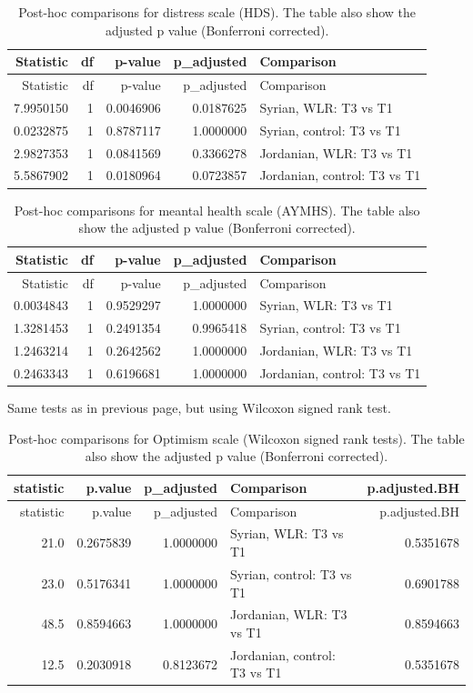 \documentclass[]{article}
\begin{document}
\begin{longtable}[]{@{}rrrrl@{}}
\caption{Post-hoc comparisons for distress scale (HDS). The table also
show the adjusted p value (Bonferroni corrected).}\tabularnewline
\toprule
Statistic & df & p-value & p\_adjusted & Comparison\tabularnewline
\midrule
\endfirsthead
\toprule
Statistic & df & p-value & p\_adjusted & Comparison\tabularnewline
\midrule
\endhead
7.9950150 & 1 & 0.0046906 & 0.0187625 & Syrian, WLR: T3 vs
T1\tabularnewline
0.0232875 & 1 & 0.8787117 & 1.0000000 & Syrian, control: T3 vs
T1\tabularnewline
2.9827353 & 1 & 0.0841569 & 0.3366278 & Jordanian, WLR: T3 vs
T1\tabularnewline
5.5867902 & 1 & 0.0180964 & 0.0723857 & Jordanian, control: T3 vs
T1\tabularnewline
\bottomrule
\end{longtable}

\begin{longtable}[]{@{}rrrrl@{}}
\caption{Post-hoc comparisons for meantal health scale (AYMHS). The
table also show the adjusted p value (Bonferroni
corrected).}\tabularnewline
\toprule
Statistic & df & p-value & p\_adjusted & Comparison\tabularnewline
\midrule
\endfirsthead
\toprule
Statistic & df & p-value & p\_adjusted & Comparison\tabularnewline
\midrule
\endhead
0.0034843 & 1 & 0.9529297 & 1.0000000 & Syrian, WLR: T3 vs
T1\tabularnewline
1.3281453 & 1 & 0.2491354 & 0.9965418 & Syrian, control: T3 vs
T1\tabularnewline
1.2463214 & 1 & 0.2642562 & 1.0000000 & Jordanian, WLR: T3 vs
T1\tabularnewline
0.2463343 & 1 & 0.6196681 & 1.0000000 & Jordanian, control: T3 vs
T1\tabularnewline
\bottomrule
\end{longtable}

\newpage

Same tests as in previous page, but using Wilcoxon signed rank test.

\begin{longtable}[]{@{}rrrlr@{}}
\caption{Post-hoc comparisons for Optimism scale (Wilcoxon signed rank
tests). The table also show the adjusted p value (Bonferroni
corrected).}\tabularnewline
\toprule
statistic & p.value & p\_adjusted & Comparison &
p.adjusted.BH\tabularnewline
\midrule
\endfirsthead
\toprule
statistic & p.value & p\_adjusted & Comparison &
p.adjusted.BH\tabularnewline
\midrule
\endhead
21.0 & 0.2675839 & 1.0000000 & Syrian, WLR: T3 vs T1 &
0.5351678\tabularnewline
23.0 & 0.5176341 & 1.0000000 & Syrian, control: T3 vs T1 &
0.6901788\tabularnewline
48.5 & 0.8594663 & 1.0000000 & Jordanian, WLR: T3 vs T1 &
0.8594663\tabularnewline
12.5 & 0.2030918 & 0.8123672 & Jordanian, control: T3 vs T1 &
0.5351678\tabularnewline
\bottomrule
\end{longtable}
\end{document}

